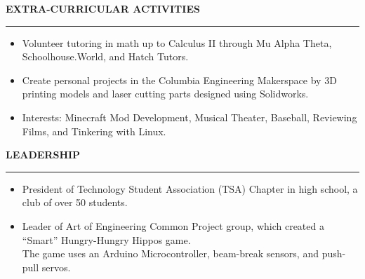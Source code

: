\documentclass[10pt,letterpaper]{article}
\begin{document}

\medskip
\MakeUppercase{{\bf Extra-Curricular Activities}}
\medskip
\hrule
\begin{list}{}{\setlength{\leftmargin}{0em}}
    \item
          \begin{itemize}
              \item Volunteer tutoring in math up to Calculus II through Mu Alpha Theta, Schoolhouse.World, and Hatch Tutors.
              \item Create personal projects in the Columbia Engineering Makerspace by 3D printing models and laser cutting parts designed using Solidworks.
              \item Interests: Minecraft Mod Development, Musical Theater, Baseball, Reviewing Films, and Tinkering with Linux.
          \end{itemize}
\end{list}



\medskip
\MakeUppercase{{\bf Leadership}}
\medskip
\hrule
\begin{list}{}{\setlength{\leftmargin}{0em}}
    \item
          \begin{itemize}
              \item President of Technology Student Association (TSA) Chapter in high school, a club of over 50 students.
              \item Leader of Art of Engineering Common Project group, which created a ``Smart'' Hungry-Hungry Hippos game.
                    \\ The game uses an Arduino Microcontroller, beam-break sensors, and push-pull servos.
          \end{itemize}
\end{list}
\end{document}
